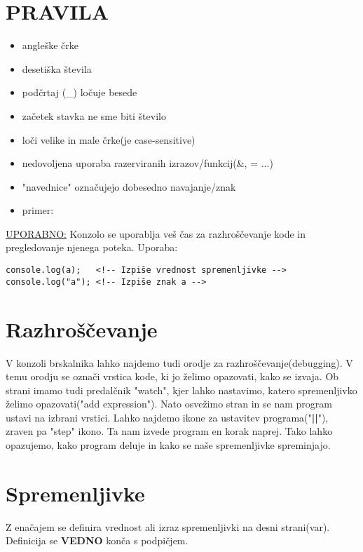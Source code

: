 \section{PRAVILA}
\begin{itemize}
	\item angleške črke
	\item desetiška števila
	\item podčrtaj (\_) ločuje besede
	\item začetek stavka ne sme biti število
	\item loči velike in male črke(je case-sensitive) 
	\item nedovoljena uporaba razerviranih izrazov/funkcij(\&, = ...)
	\item "navednice" označujejo dobesedno navajanje/znak
	\item primer:
\end{itemize}
\underline{UPORABNO:} Konzolo se uporablja veš čas za razhroščevanje kode in pregledovanje njenega poteka. Uporaba:
\begin{verbatim}
console.log(a);   <!-- Izpiše vrednost spremenljivke -->
console.log("a"); <!-- Izpiše znak a -->
\end{verbatim}



\section{Razhroščevanje}

V konzoli brskalnika lahko najdemo tudi orodje za razhroščevanje(debugging). V temu orodju se označi vrstica kode, ki jo želimo opazovati, kako se izvaja. Ob strani imamo tudi predalčnik "watch", kjer lahko nastavimo, katero spremenljivko želimo opazovati("add expression"). Nato osvežimo stran in se nam program ustavi na izbrani vrstici. Lahko najdemo ikone za ustavitev programa("\textbf{||}"), zraven pa "step" ikono. Ta nam izvede program en korak naprej. Tako lahko opazujemo, kako program deluje in kako se naše spremenljivke spreminjajo.
\pagebreak
\section{Spremenljivke}

{\centering{}\par}
Z enačajem se definira vrednost ali izraz spremenljivki na desni strani(var). Definicija se \textbf{VEDNO} konča s podpičjem.\\

